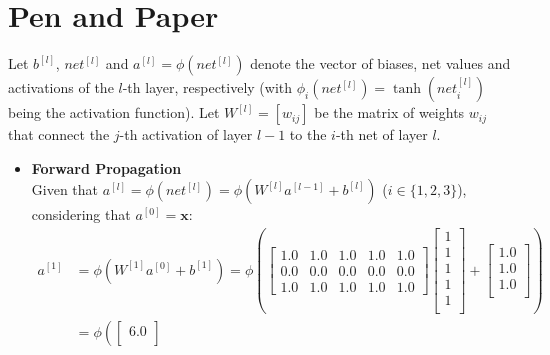 \documentclass{exam}
\begin{document}
    \section{Pen and Paper}
    \begin{questions}
        \item Let $b^{[l]}$, $net^{[l]}$ and $a^{[l]} = \phi(net^{[l]})$ denote the vector of biases, net values and activations of the $l$-th layer, respectively (with $\phi_i(net^{[l]}) = \tanh(net_i^{[l]})$ being the activation function). Let $W^{[l]} = [w_{ij}]$ be the matrix of weights $w_{ij}$ that connect the $j$-th activation of layer $l-1$ to the $i$-th net of layer $l$.
        \begin{itemize}
            \item \textbf{Forward Propagation}
            \vspace{0.4em} \\
            Given that $a^{[l]} = \phi(net^{[l]}) = \phi(W^{[l]}a^{[l-1]} + b^{[l]})$ ($i \in \{1, 2, 3\}$), considering that $a^{[0]} = \mathbf{x}$:
            \begin{align*}
                a^{[1]} &= \phi(W^{[1]}a^{[0]} + b^{[1]}) = \phi\left(
                \begin{bmatrix}
                    1.0 & 1.0 & 1.0 & 1.0 & 1.0  \\
                    0.0 & 0.0 & 0.0 & 0.0 & 0.0  \\
                    1.0 & 1.0 & 1.0 & 1.0 & 1.0 
                \end{bmatrix} 
                \begin{bmatrix}
                    1  \\
                    1  \\
                    1  \\
                    1  \\
                    1  \\
                \end{bmatrix} + 
                \begin{bmatrix}
                    1.0  \\
                    1.0  \\
                    1.0  \\
                \end{bmatrix} \right) \\
                &= \phi\left(
                \begin{bmatrix}
                    6.0  \\

\end{bmatrix}
\end{align*}
\end{itemize}
\end{questions}
\end{document}
